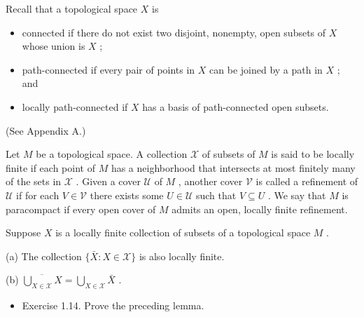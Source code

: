 \begin{definition}
\label{def:1-extra-3}
\mathlibok
Recall that a topological space $X$ is

\begin{itemize}
\item connected if there do not exist two disjoint, nonempty, open subsets of $X$ whose union is $X$ ;
\end{itemize}

\begin{itemize}
\item path-connected if every pair of points in $X$ can be joined by a path in $X$ ; and
\end{itemize}

\begin{itemize}
\item locally path-connected if $X$ has a basis of path-connected open subsets.
\end{itemize}

(See Appendix A.)
\end{definition}

\begin{definition}
\label{def:1-extra-4}
\mathlibok
Let $M$ be a topological space. A collection $\mathcal{X}$ of subsets of $M$ is said to be locally finite if each point of $M$ has a neighborhood that intersects at most finitely many of the sets in $\mathcal{X}$ . Given a cover $\mathcal{U}$ of $M$ , another cover $\mathcal{V}$ is called a refinement of $\mathcal{U}$ if for each $V \in  \mathcal{V}$ there exists some $U \in  \mathcal{U}$ such that $V \subseteq  U$ . We say that $M$ is paracompact if every open cover of $M$ admits an open, locally finite refinement.
\end{definition}

\begin{lemma}
\label{lem:1-13}
\mathlibok
{}
Suppose $X$ is a locally finite collection of subsets of a topological space $M$ .

(a) The collection $\{ \bar{X} : X \in  \mathcal{X}\}$ is also locally finite.

(b) $\overline{\mathop{\bigcup }\limits_{{X \in  \mathcal{X}}}X} = \mathop{\bigcup }\limits_{{X \in  \mathcal{X}}}\bar{X}$ .
\end{lemma}

\begin{exercise}
\label{exer:1-14}
\mathlibok
{}
\begin{itemize}
\item Exercise 1.14. Prove the preceding lemma.
\end{itemize}
\end{exercise}


